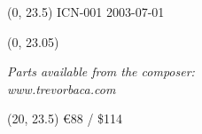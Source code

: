 \documentclass[10pt]{article}
\begin{document}
\begin{textblock}{7}(0, 23.5)
ICN-001 2003-07-01
\end{textblock}


\begin{textblock}{23}(0, 23.05)
\begin{center}
\textit{Parts available from the composer:} \\
\textit{www.trevorbaca.com}
\end{center}
\end{textblock}


\begin{textblock}{3}(20, 23.5)
\hfill \euro 88 / \$114
\end{textblock}
\end{document}
